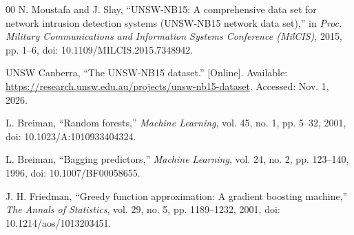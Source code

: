 \documentclass[conference]{IEEEtran}
\begin{document}
\begin{thebibliography}{00}
N. Moustafa and J. Slay, ``UNSW-NB15: A comprehensive data set for network intrusion detection systems (UNSW-NB15 network data set),'' in \emph{Proc. Military Communications and Information Systems Conference (MilCIS)}, 2015, pp. 1--6, doi: 10.1109/MILCIS.2015.7348942.

UNSW Canberra, ``The UNSW-NB15 dataset.'' [Online]. Available: \url{https://research.unsw.edu.au/projects/unsw-nb15-dataset}. Accessed: Nov. 1, 2026.

L. Breiman, ``Random forests,'' \emph{Machine Learning}, vol. 45, no. 1, pp. 5--32, 2001, doi: 10.1023/A:1010933404324.

L. Breiman, ``Bagging predictors,'' \emph{Machine Learning}, vol. 24, no. 2, pp. 123--140, 1996, doi: 10.1007/BF00058655.

J. H. Friedman, ``Greedy function approximation: A gradient boosting machine,'' \emph{The Annals of Statistics}, vol. 29, no. 5, pp. 1189--1232, 2001, doi: 10.1214/aos/1013203451.
\end{thebibliography}
\end{document}
